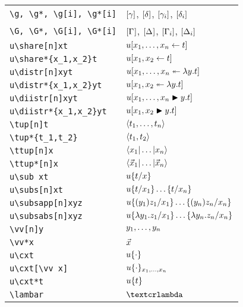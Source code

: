 \documentclass{article}
\begin{document}
\centering


\begin{tabular}{l@{\qquad\qquad}l}
	\verb|\g, \g*, \g[i], \g*[i]|	& $\g$, $\g*$, $\g[i]$, $\g*[i]$	\\[5pt]
	\verb|\G, \G*, \G[i], \G*[i]|	& $\G$, $\G*$, $\G[i]$, $\G*[i]$	\\[5pt]
	\verb|u\share[n]xt| 				& $u\share[n]xt$					\\[5pt]
    \verb|u\share*{x_1,x_2}t|		& $u\share*{x_1,x_2}t$			\\[5pt]
	\verb|u\distr[n]xyt| 			& $u\distr[n]xyt$				\\[5pt]
    \verb|u\distr*{x_1,x_2}yt|		& $u\distr*{x_1,x_2}yt$			\\[5pt]
	\verb|u\diistr[n]xyt| 			& $u\diistr[n]xyt$				\\[5pt]
    \verb|u\diistr*{x_1,x_2}yt|		& $u\diistr*{x_1,x_2}yt$			\\[5pt]
	\verb|\tup[n]t|					& $\tup[n]t$						\\[5pt]
	\verb|\tup*{t_1,t_2}|			& $\tup*{t_1,t_2}$				\\[5pt]
	\verb|\ttup[n]x|					& $\ttup[n]x$					\\[5pt]
	\verb|\ttup*[n]x|				& $\ttup*[n]x$					\\[5pt]
    \verb|u\sub xt|					& $u\sub xt$						\\[5pt]
    \verb|u\subs[n]xt|				& $u\subs[n]xt$					\\[5pt]
    \verb|u\subsapp[n]xyz|			& $u\subsapp[n]xyz$				\\[5pt]
    \verb|u\subsabs[n]xyz|			& $u\subsabs[n]xyz$				\\[5pt]
	\verb|\vv[n]y|					& $\vv[n]y$						\\[5pt]
	\verb|\vv*x|						& $\vv*x$						\\[5pt]
    \verb|u\cxt|						& $u\cxt$						\\[5pt]
    \verb|u\cxt[\vv x]|				& $u\cxt[\vv x]$					\\[5pt]
    \verb|u\cxt*t|					& $u\cxt*t$						\\[5pt]
    \verb|\lambar|					& $\lambar$
\end{tabular}
\end{document}
